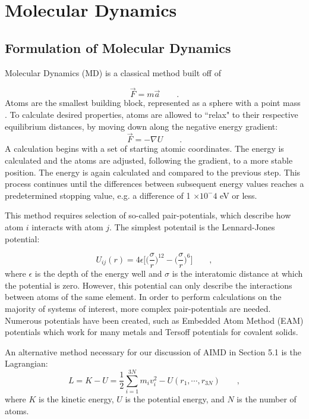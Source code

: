 \documentclass[3p,review,12pt]{elsarticle}
\begin{document}
\section{Molecular Dynamics}
\subsection{Formulation of Molecular Dynamics}
Molecular Dynamics (MD) is a classical method built off of

\begin{equation}
\vec{F}=m\vec{a} \qquad .
\end{equation}
Atoms are the smallest building block, represented as a sphere with a point mass \cite{Lee2012}. To calculate desired properties, atoms are allowed to ``relax" to their respective equilibrium distances, by moving down along the negative energy gradient:
\begin{equation}
\vec{F} = - \nabla U \qquad .
\end{equation}
A calculation begins with a set of starting atomic coordinates. The energy is calculated and the atoms are adjusted, following the gradient, to a more stable position. The energy is again calculated and compared to the previous step. This process continues until the differences between subsequent energy values reaches a predetermined stopping value, e.g. a difference of 1 $\times 10^-4$ eV or less.
\par
This method requires selection of so-called pair-potentials, which describe how atom $i$ interacts with atom $j$. The simplest potentail is the Lennard-Jones potential:

\begin{equation}
U_{ij}(r) = 4\epsilon \Bigg[\bigg(\frac{\sigma}{r}\bigg)^{12}-\bigg(\frac{\sigma}{r}\bigg)^{6}\Bigg] \qquad ,
\end{equation}
where $\epsilon$ is the depth of the energy well and $\sigma$ is the interatomic distance at which the potential is zero. However, this potential can only describe the interactions between atoms of the same element. In order to perform calculations on the majority of systems of interest, more complex pair-potentials are needed. Numerous potentials have been created, such as Embedded Atom Method (EAM) potentials which work for many metals and Tersoff potentials for covalent solids. 
\par 
An alternative method necessary for our discussion of AIMD in Section 5.1 is the Lagrangian:
\begin{equation}
L = K-U = \frac{1}{2}\sum_{i=1}^{3N}m_{i}v^{2}_{i}-U(r_{1}, \cdots, r_{3N})\qquad ,
\end{equation}
where $K$ is the kinetic energy, $U$ is the potential energy, and $N$ is the number of atoms.
\end{document}
